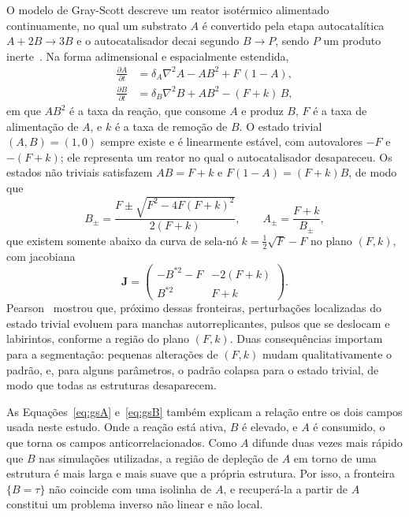 \documentclass[final,5p,times,twocolumn]{elsarticle}
\begin{document}
O modelo de Gray-Scott descreve um reator isotérmico alimentado continuamente, no qual um substrato $A$ é convertido pela etapa autocatalítica $A+2B\rightarrow 3B$ e o autocatalisador decai segundo $B\rightarrow P$, sendo $P$ um produto inerte~\cite{gray1983,gray1984}. Na forma adimensional e espacialmente estendida,
\begin{subequations}\label{eq:gs}
\begin{align}
\frac{\partial A}{\partial t} &= \delta_A\nabla^2 A - A B^2 + F\,(1-A), \label{eq:gsA}\\
\frac{\partial B}{\partial t} &= \delta_B\nabla^2 B + A B^2 - (F+k)\,B, \label{eq:gsB}
\end{align}
\end{subequations}
em que $AB^2$ é a taxa da reação, que consome $A$ e produz $B$, $F$ é a taxa de alimentação de $A$, e $k$ é a taxa de remoção de $B$. O estado trivial $(A,B)=(1,0)$ sempre existe e é linearmente estável, com autovalores $-F$ e $-(F+k)$; ele representa um reator no qual o autocatalisador desapareceu. Os estados não triviais satisfazem $AB=F+k$ e $F(1-A)=(F+k)B$, de modo que
\begin{equation}\label{eq:gsfixed}
B_\pm=\frac{F\pm\sqrt{F^2-4F(F+k)^2}}{2(F+k)},\qquad A_\pm=\frac{F+k}{B_\pm},
\end{equation}
que existem somente abaixo da curva de sela-nó $k=\tfrac12\sqrt{F}-F$ no plano $(F,k)$, com jacobiana
\begin{equation}\label{eq:gsjac}
\mathbf{J}=\begin{pmatrix} -B^{*2}-F & -2(F+k)\\ B^{*2} & F+k\end{pmatrix}.
\end{equation}
Pearson~\cite{pearson1993} mostrou que, próximo dessas fronteiras, perturbações localizadas do estado trivial evoluem para manchas autorreplicantes, pulsos que se deslocam e labirintos, conforme a região do plano $(F,k)$. Duas consequências importam para a segmentação: pequenas alterações de $(F,k)$ mudam qualitativamente o padrão, e, para alguns parâmetros, o padrão colapsa para o estado trivial, de modo que todas as estruturas desaparecem.

As Equações~\eqref{eq:gsA} e~\eqref{eq:gsB} também explicam a relação entre os dois campos usada neste estudo. Onde a reação está ativa, $B$ é elevado, e $A$ é consumido, o que torna os campos anticorrelacionados. Como $A$ difunde duas vezes mais rápido que $B$ nas simulações utilizadas, a região de depleção de $A$ em torno de uma estrutura é mais larga e mais suave que a própria estrutura. Por isso, a fronteira $\{B=\tau\}$ não coincide com uma isolinha de $A$, e recuperá-la a partir de $A$ constitui um problema inverso não linear e não local.
\end{document}
